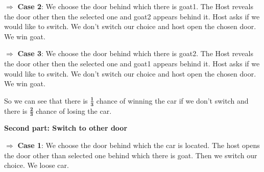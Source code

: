 \documentclass{beamer}
\begin{document}
$\Rightarrow$ \textbf{Case 2}: We choose the door behind which there is goat1. The Host reveals the door other then the selected one and goat2 appears behind it. Host asks if we would like to switch. We don't switch our choice and host open the chosen door. We win goat.
\begin{figure}
\begin{center}
    

   \end{center}
\end{figure} 
\clearpage
$\Rightarrow$ \textbf{Case 3}: We choose the door behind which there is goat2. The Host reveals the door other then the selected one and goat1 appears behind it. Host asks if we would like to switch. We don't switch our choice and host open the chosen door. We win goat.
\begin{figure}
\begin{center}
    

   \end{center}
\end{figure} 

So we can see that there is $\frac{\textbf{1}}{\textbf{3}}$ chance of winning the car if we don't switch and there is $\frac{\textbf{2}}{\textbf{3}}$ chance of losing the car.\\
\clearpage
\begin{center}
\textbf{Second part: Switch to other door}
\end{center}

$\Rightarrow$ \textbf{Case 1}: We choose the door behind which the car is located. The host opens the door other than selected one behind which there is goat. Then we switch our choice. We loose car.
\begin{figure}
\begin{center}
    

   \end{center}
\end{figure} 
\end{document}
